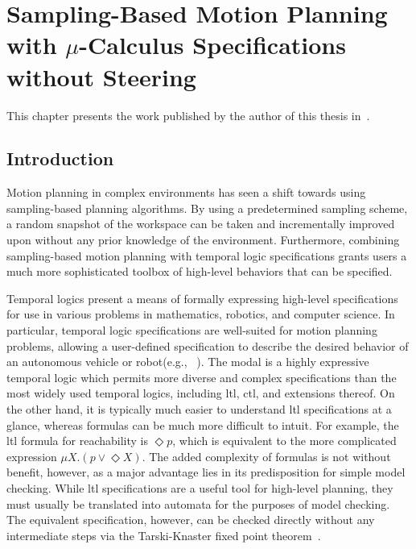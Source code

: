 
\chapter{\texorpdfstring{Sampling-Based Motion Planning with $\mu$-Calculus Specifications without Steering}{Sampling-Based Motion Planning with mu-Calculus Specifications without Steering}}
\label{chap:sstpaper}

This chapter presents the work published by the author of this thesis in~\cite{Larocque2018}.

\section{Introduction}

Motion planning in complex environments has seen a shift towards using sampling-based planning algorithms. By using a predetermined sampling scheme, a random snapshot of the workspace can be taken and incrementally improved upon without any prior knowledge of the environment. Furthermore, combining sampling-based motion planning with temporal logic specifications grants users a much more sophisticated toolbox of high-level behaviors that can be specified. 

Temporal logics present a means of formally expressing high-level specifications for use in various problems in mathematics, robotics, and computer science. In particular, temporal logic specifications are well-suited for motion planning problems, allowing a user-defined specification to describe the desired behavior of an autonomous vehicle or robot(e.g., ~\cite{Lin2014, Wolff2014,Doherty2013}). The modal \mucalc{} is a highly expressive temporal logic which permits more diverse and complex specifications than the most widely used temporal logics, including \gls{ltl}, \gls{ctl}, and extensions thereof. On the other hand, it is typically much easier to understand \gls{ltl} specifications at a glance, whereas \mucalc{} formulas can be much more difficult to intuit. For example, the \gls{ltl} formula for reachability is $\Diamond p$, which is equivalent to the more complicated \mucalc{} expression $\mu X.(p \lor \Diamond X)$. The added complexity of \mucalc{} formulas is not without benefit, however, as a major advantage lies in its predisposition for simple model checking. While \gls{ltl} specifications are a useful tool for high-level planning, they must usually be translated into automata for the purposes of model checking. The equivalent \mucalc{} specification, however, can be checked directly without any intermediate steps via the Tarski-Knaster fixed point theorem~\cite{Emerson1999, Tarski1955}.

